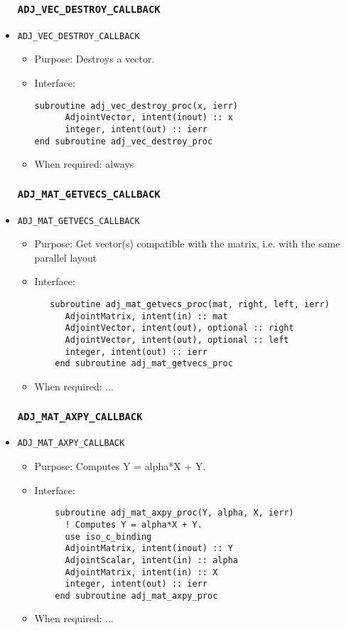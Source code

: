 \documentclass[10pt,authoryear]{elsarticle}
\begin{document}
\begin{itemize}
\subsubsection{\texttt{ADJ\_VEC\_DESTROY\_CALLBACK}}
\item \texttt{ADJ\_VEC\_DESTROY\_CALLBACK}
 \begin{itemize}
 \item Purpose: Destroys a vector.
 \item Interface:
\begin{verbatim}
subroutine adj_vec_destroy_proc(x, ierr)
      AdjointVector, intent(inout) :: x
      integer, intent(out) :: ierr
end subroutine adj_vec_destroy_proc
\end{verbatim}
 \item When required: always
 \end{itemize}

\subsubsection{\texttt{ADJ\_MAT\_GETVECS\_CALLBACK}}
\item \texttt{ADJ\_MAT\_GETVECS\_CALLBACK}
 \begin{itemize}
 \item Purpose: Get vector(s) compatible with the matrix, i.e. with the same parallel layout
 \item Interface:
\begin{verbatim}
   subroutine adj_mat_getvecs_proc(mat, right, left, ierr)
      AdjointMatrix, intent(in) :: mat
      AdjointVector, intent(out), optional :: right
      AdjointVector, intent(out), optional :: left
      integer, intent(out) :: ierr
    end subroutine adj_mat_getvecs_proc
\end{verbatim}
 \item When required: ...
 \end{itemize}

\subsubsection{\texttt{ADJ\_MAT\_AXPY\_CALLBACK}}
\item \texttt{ADJ\_MAT\_AXPY\_CALLBACK}
 \begin{itemize}
 \item Purpose: Computes Y = alpha*X + Y.
 \item Interface:
\begin{verbatim}
    subroutine adj_mat_axpy_proc(Y, alpha, X, ierr)
      ! Computes Y = alpha*X + Y.
      use iso_c_binding
      AdjointMatrix, intent(inout) :: Y
      AdjointScalar, intent(in) :: alpha
      AdjointMatrix, intent(in) :: X
      integer, intent(out) :: ierr
    end subroutine adj_mat_axpy_proc
\end{verbatim}
 \item When required: ...
 \end{itemize}


\end{itemize}
\end{document}
